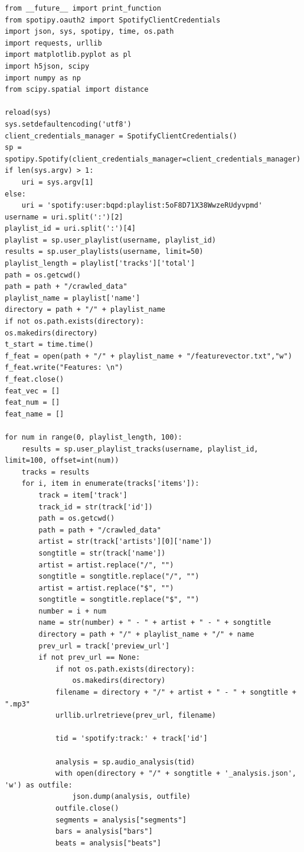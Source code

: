 \documentclass[a4paper,oneside,12pt]{report}
\begin{document}
\begin{lstlisting}
from __future__ import print_function 
from spotipy.oauth2 import SpotifyClientCredentials
import json, sys, spotipy, time, os.path
import requests, urllib
import matplotlib.pyplot as pl
import h5json, scipy
import numpy as np
from scipy.spatial import distance

reload(sys)
sys.setdefaultencoding('utf8')
client_credentials_manager = SpotifyClientCredentials()
sp = spotipy.Spotify(client_credentials_manager=client_credentials_manager)
if len(sys.argv) > 1:
	uri = sys.argv[1]
else:
	uri = 'spotify:user:bqpd:playlist:5oF8D71X38WwzeRUdyvpmd'
username = uri.split(':')[2]
playlist_id = uri.split(':')[4]
playlist = sp.user_playlist(username, playlist_id)
results = sp.user_playlists(username, limit=50)
playlist_length = playlist['tracks']['total']
path = os.getcwd() 
path = path + "/crawled_data" 
playlist_name = playlist['name']
directory = path + "/" + playlist_name
if not os.path.exists(directory):
os.makedirs(directory)
t_start = time.time()
f_feat = open(path + "/" + playlist_name + "/featurevector.txt","w")
f_feat.write("Features: \n")
f_feat.close()
feat_vec = []
feat_num = []
feat_name = []

for num in range(0, playlist_length, 100):
	results = sp.user_playlist_tracks(username, playlist_id, limit=100, offset=int(num))
	tracks = results
	for i, item in enumerate(tracks['items']):
		track = item['track']
		track_id = str(track['id'])
		path = os.getcwd() 
		path = path + "/crawled_data"
		artist = str(track['artists'][0]['name'])
		songtitle = str(track['name'])
		artist = artist.replace("/", "")
		songtitle = songtitle.replace("/", "")
		artist = artist.replace("$", "")
		songtitle = songtitle.replace("$", "")
		number = i + num
		name = str(number) + " - " + artist + " - " + songtitle
		directory = path + "/" + playlist_name + "/" + name
		prev_url = track['preview_url']
		if not prev_url == None:
			if not os.path.exists(directory):
				os.makedirs(directory)
			filename = directory + "/" + artist + " - " + songtitle + ".mp3"         
			urllib.urlretrieve(prev_url, filename)			
			
			tid = 'spotify:track:' + track['id']
			
			analysis = sp.audio_analysis(tid)	
			with open(directory + "/" + songtitle + '_analysis.json', 'w') as outfile:
				json.dump(analysis, outfile)
			outfile.close()            
			segments = analysis["segments"]
			bars = analysis["bars"]
			beats = analysis["beats"]            
			

\end{lstlisting}
\end{document}

